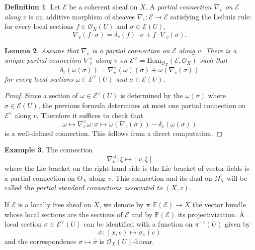 \documentclass[12pt]{amsart}
\theoremstyle{definition}
\newtheorem{definition}{Definition}[subsection]
\newtheorem{example}[definition]{Example}
\theoremstyle{plain}
\newtheorem{lemma}[definition]{Lemma}
\theoremstyle{exampstyle}
\theoremstyle{exampstyle}\newtheorem{thmxbis}{Theorem}
\numberwithin{equation}{section}
\theoremstyle{remark}
\begin{document}
\begin{definition} \label{definition-partialconnectionalongavectorfield}
Let $\mathcal E$ be a coherent sheaf on $X$. A {\em partial connection $\nabla_v$ on $\mathcal E$ along $v$} is an additive morphism of sheaves
$\nabla_v: \mathcal E \rightarrow \mathcal E$
satisfying the Leibniz rule: for every local sections $f \in \mathcal O_X(U)$ and  $\sigma \in \mathcal E(U)$,
$$\nabla_v(f\cdot \sigma) = \delta_v(f) \cdot \sigma + f \cdot \nabla_v(\sigma).$$

\end{definition} 


\begin{lemma} \label{dual-connection} 
Assume that $\nabla_v$ is a partial connection on $\mathcal E$ along $v$. There is a unique partial connection $\nabla_v^\vee$ along $v$ on $\mathcal E^\vee = \mathrm{Hom}_{\mathcal O_X}(\mathcal E, \mathcal O_X)$  such that 
\begin{equation}\label{equation-dual}
\delta_v(\omega(\sigma)) = \nabla_v^\vee(\omega) (\sigma) + \omega(\nabla_v(\sigma))
\end{equation}
for every local sections $\omega \in \mathcal E^\vee(U)$ and $\sigma \in \mathcal E(U)$.
\end{lemma} 

\begin{proof} 
Since a section of $\omega \in \mathcal E^\vee(U)$ is determined by the $\omega(\sigma)$ where $\sigma \in \mathcal E(U)$, the previous formula determines at most one partial connection on $\mathcal E^\vee$ along $v$. Therefore it suffices to check that 
$$ \omega \mapsto   \nabla_v^\vee\omega: \sigma \mapsto \omega(\nabla_v(\sigma)) - \delta_v(\omega(\sigma))$$
is a well-defined connection. This follows from a direct computation.  
\end{proof} 

\begin{example} \label{standard}
The connection 
$$\nabla^{\mathrm{st}}_v : \xi \mapsto [v , \xi]$$
where the Lie bracket on the right-hand side is the Lie bracket of vector fields is a partial connection on $\Theta_X$ along $v$. This connection and its dual on $\Omega^1_X$ will be called the {\em partial standard connections associated to $(X,v)$}.
\end{example} 

If $\mathcal E$ is a locally free sheaf on $X$, we denote by $\pi: \mathbb{E}(\mathcal E) \rightarrow X$ the vector bundle  whose local sections are the sections of $\mathcal E$ and by $\mathbb{P}(\mathcal E)$ its projectivization. A local section $\sigma \in \mathcal E^\vee(U)$ can be identified with a function on $\pi^{-1}(U)$ given by 
$$\overline{\sigma}: (x,e) \mapsto \sigma_x(e)$$
and the correspondence $\sigma \mapsto \overline{\sigma}$ is $\mathcal O_X(U)$-linear.
\end{document}
